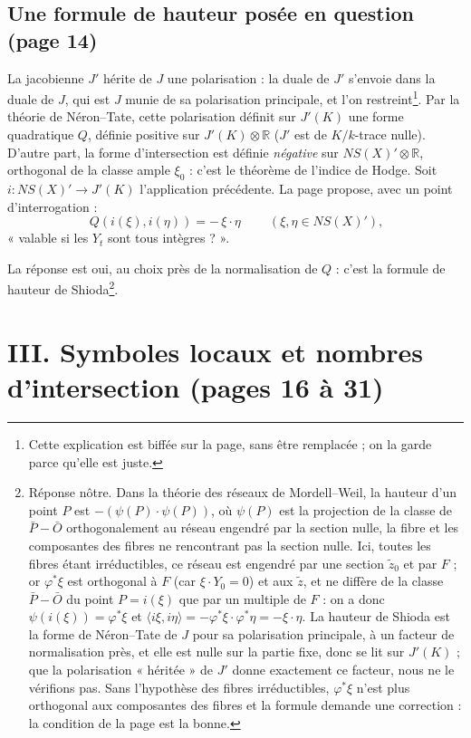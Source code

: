 \documentclass[11pt,a4paper]{article}
\begin{document}
\subsection*{Une formule de hauteur posée en question (page 14)}

La jacobienne $J'$ hérite de $J$ une polarisation : la duale de $J'$
s'envoie dans la duale de $J$, qui est $J$ munie de sa polarisation
principale, et l'on restreint\footnote{Cette explication est biffée sur la
page, sans être remplacée ; on la garde parce qu'elle est juste.}. Par la
théorie de Néron–Tate, cette polarisation définit sur $J'(K)$ une forme
quadratique $Q$, définie positive sur $J'(K) \otimes \mathbb{R}$ ($J'$ est
de $K/k$-trace nulle). D'autre part, la forme d'intersection est définie
\emph{négative} sur $NS(X)' \otimes \mathbb{R}$, orthogonal de la classe
ample $\xi_0$ : c'est le théorème de l'indice de Hodge. Soit
$i : NS(X)' \to J'(K)$ l'application précédente. La page propose, avec un
point d'interrogation :
\[
  \boxed{\ Q(i(\xi), i(\eta)) = -\,\xi \cdot \eta\ } \qquad
  (\xi, \eta \in NS(X)'),
\]
« valable si les $Y_t$ sont tous intègres ? ».

La réponse est oui, au choix près de la normalisation de $Q$ : c'est la
formule de hauteur de Shioda\footnote{Réponse nôtre. Dans la théorie des
réseaux de Mordell–Weil, la hauteur d'un point $P$ est $-(\psi(P) \cdot
\psi(P))$, où $\psi(P)$ est la projection de la classe de $\bar P - \bar O$
orthogonalement au réseau engendré par la section nulle, la fibre et les
composantes des fibres ne rencontrant pas la section nulle. Ici, toutes
les fibres étant irréductibles, ce réseau est engendré par une section
$\tilde z_0$ et par $F$ ; or $\varphi^*\xi$ est orthogonal à $F$ (car
$\xi \cdot Y_0 = 0$) et aux $\tilde z$, et ne diffère de la classe
$\bar P - \bar O$ du point $P = i(\xi)$ que par un multiple de $F$ : on a
donc $\psi(i(\xi)) = \varphi^*\xi$ et
$\langle i\xi, i\eta\rangle = -\varphi^*\xi \cdot \varphi^*\eta = -\xi\cdot\eta$.
La hauteur de Shioda est la forme de Néron–Tate de $J$ pour sa
polarisation principale, à un facteur de normalisation près, et elle est
nulle sur la partie fixe, donc se lit sur $J'(K)$ ; que la polarisation
« héritée » de $J'$ donne exactement ce facteur, nous ne le vérifions pas.
Sans l'hypothèse des fibres irréductibles, $\varphi^*\xi$ n'est plus
orthogonal aux composantes des fibres et la formule demande une
correction : la condition de la page est la bonne.}.

\section*{III. Symboles locaux et nombres d'intersection (pages 16 à 31)}
\end{document}
